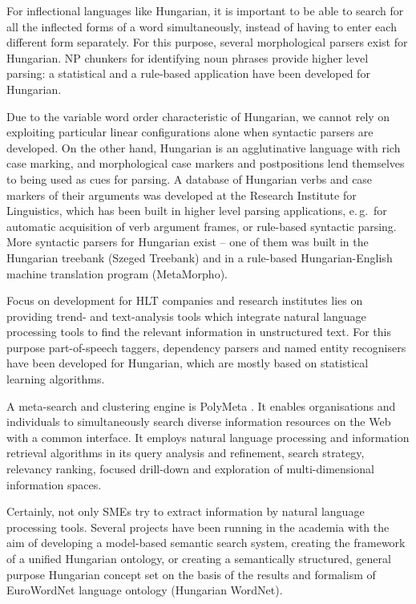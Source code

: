 \begin{multicols}{2}
  For inflectional languages like Hungarian, it is important to be able to search for all the inflected forms of a word simultaneously, instead of having to enter each different form separately. For this purpose, several morphological parsers exist for Hungarian. NP chunkers for identifying noun phrases provide higher level parsing: a statistical and a rule-based application have been developed for Hungarian. 

  Due to the variable word order characteristic of Hungarian, we cannot rely on exploiting particular linear configurations alone when syntactic parsers are developed. On the other hand, Hungarian is an agglutinative language with rich case marking, and morphological case markers and postpositions lend themselves to being used as cues for parsing. A database of Hungarian verbs and case markers of their arguments was developed at the Research Institute for Linguistics, which has been built in higher level parsing applications, e.\,g.~for automatic acquisition of verb argument frames, or rule-based syntactic parsing. More syntactic parsers for Hungarian exist -- one of them was built in the Hungarian treebank (Szeged Treebank) and in a rule-based Hungarian-English machine translation program (MetaMorpho).

  Focus on development for HLT companies and research institutes lies on providing trend- and text-analysis tools which integrate natural language processing tools to find the relevant information in unstructured text. For this purpose part-of-speech taggers, dependency parsers and named entity recognisers have been developed for Hungarian, which are mostly based on statistical learning algorithms.

  A meta-search and clustering engine is PolyMeta \cite{polymeta}. It enables organisations and individuals to simultaneously search diverse information resources on the Web with a common interface. It employs natural language processing and information retrieval algorithms in its query analysis and refinement, search strategy, relevancy ranking, focused drill-down and exploration of multi-dimensional information spaces.

  Certainly, not only SMEs try to extract information by natural language processing tools. Several projects have been running in the academia with the aim of developing a model-based semantic search system, creating the framework of a unified Hungarian ontology, or creating a semantically structured, general purpose Hungarian concept set on the basis of the results and formalism of EuroWordNet language ontology (Hungarian WordNet).


\end{multicols}
